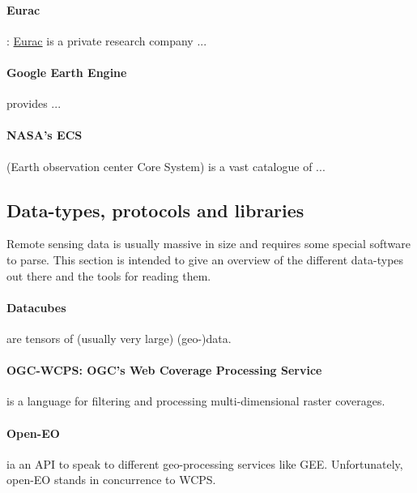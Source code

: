 \paragraph{Eurac}: \href{http://www.eurac.edu}{Eurac} is a private research company ...

\paragraph{Google Earth Engine} provides ...

\paragraph{NASA's ECS} (Earth observation center Core System) is a vast catalogue of ...






\subsection{Data-types, protocols and libraries}

Remote sensing data is usually massive in size and requires some special software to parse.
This section is intended to give an overview of the different data-types out there and the tools for reading them.

\paragraph{Datacubes} are tensors of (usually very large) (geo-)data.

\paragraph{OGC-WCPS: OGC's Web Coverage Processing Service} is a language for filtering and processing multi-dimensional raster coverages.

\paragraph{Open-EO} ia an API to speak to different geo-processing services like GEE. Unfortunately, open-EO stands in concurrence to WCPS.

